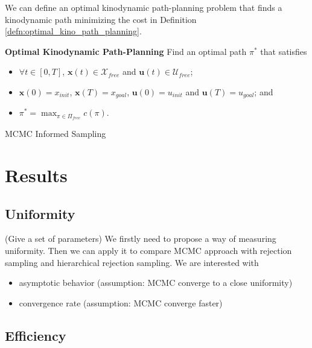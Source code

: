 \documentclass[letterpaper, 10 pt, conference]{ieeeconf}  %
\begin{document}
We can define an optimal kinodynamic path-planning problem that finds a kinodynamic path minimizing the cost in Definition \ref{defn:optimal_kino_path_planning}.
\begin{defn}{ \textbf{Optimal Kinodynamic Path-Planning} }
\label{defn:optimal_kino_path_planning}
	Find an optimal path $  \pi^* $ that satisfies
	\begin{itemize}
	\item $\forall t \in [0,T] $, $ \bm{x} (t) \in \mathcal{X}_{free}  $ and $ \bm{u} (t) \in \mathcal{U}_{free} $;
	\item $ \bm{x} (0) = x_{init} $, $ \bm{x} (T) = x_{goal} $, $ \bm{u} (0) = u_{init} $ and $ \bm{u} (T) = u_{goal} $; and
	\item $ \pi^* = \max_{ \pi \in \Pi_{free} } c( \pi ) $. 
	\end{itemize}
\end{defn}


\begin{algorithm}
	\begin{algorithmic}[1]
		\STATE
   	\end{algorithmic}
	\caption{MCMC Informed Sampling}
	\label{alg:mcmc_informed_sampling}
\end{algorithm}



\section{Results}

\subsection{Uniformity}

(Give a set of parameters)
We firstly need to propose a way of measuring uniformity.
Then we can apply it to compare MCMC approach with rejection sampling and hierarchical rejection sampling.
We are interested with
\begin{itemize}
	\item asymptotic behavior (assumption: MCMC converge to a close uniformity)
	\item convergence rate (assumption: MCMC converge faster)
\end{itemize}

\subsection{Efficiency}
\end{document}
